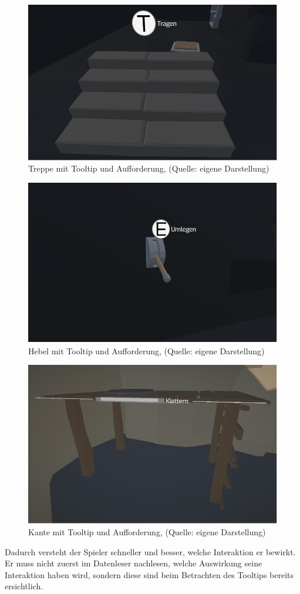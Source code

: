 \begin{figure}[ht]
\centering
\includegraphics[width=0.8\linewidth]{content/pictures/stair_tooltip_title.jpg}
\caption{Treppe mit Tooltip und Aufforderung, (Quelle: eigene Darstellung)}
\label{fig:stair_tooltip_title}
\end{figure}
\newpage
\begin{figure}[ht]
\centering
\includegraphics[width=0.8\linewidth]{content/pictures/lever_tooltip_title.jpg}
\caption{Hebel mit Tooltip und Aufforderung, (Quelle: eigene Darstellung)}
\label{fig:lever_tooltip_title}
\end{figure}
\newpage
\begin{figure}[ht]
\centering
\includegraphics[width=0.8\linewidth]{content/pictures/leadge_tooltip_title.jpg}
\caption{Kante mit Tooltip und Aufforderung, (Quelle: eigene Darstellung)}
\label{fig:leadge_title}
\end{figure}
Dadurch versteht der Spieler schneller und besser, welche Interaktion er bewirkt. Er muss nicht zuerst im Datenleser nachlesen, welche Auswirkung seine Interaktion haben wird, sondern diese sind beim Betrachten des Tooltips bereits ersichtlich.

